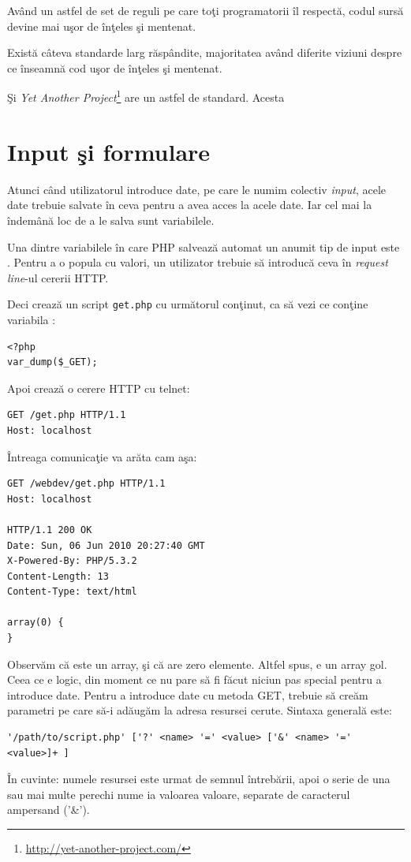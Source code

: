 Având un astfel de set de reguli pe care toţi programatorii îl respectă, codul
sursă devine mai uşor de înţeles şi mentenat.

Există câteva standarde larg răspândite, majoritatea având diferite viziuni
despre ce înseamnă {\glqq}cod uşor de înţeles şi mentenat{\grqq}.

Şi \textit{Yet Another Project}\footnote{\url{http://yet-another-project.com/}}
are un astfel de standard. Acesta


\section{Input şi formulare}
Atunci când utilizatorul introduce date, pe care le numim colectiv \textsl{input},
acele date trebuie salvate în ceva pentru a avea acces la acele date. Iar cel
mai la îndemână loc de a le salva sunt variabilele.

Una dintre variabilele în care PHP salvează automat un anumit tip de input este \get.
Pentru a o popula cu valori, un utilizator trebuie să introducă ceva în \textsl{request line}-ul
cererii HTTP.

Deci crează un script \texttt{get.php} cu următorul conţinut, ca să vezi ce conţine variabila \get:
\begin{lstlisting}
<?php
var_dump($_GET);
\end{lstlisting}
Apoi crează o cerere HTTP cu telnet:
\begin{verbatim}
GET /get.php HTTP/1.1
Host: localhost

\end{verbatim}
Întreaga comunicaţie va arăta cam aşa:
\begin{verbatim}
GET /webdev/get.php HTTP/1.1
Host: localhost

HTTP/1.1 200 OK
Date: Sun, 06 Jun 2010 20:27:40 GMT
X-Powered-By: PHP/5.3.2
Content-Length: 13
Content-Type: text/html

array(0) {
}
\end{verbatim}
Observăm că {\get} este un array, şi că are zero elemente. Altfel spus,
e un array gol. Ceea ce e logic, din moment ce nu pare să fi făcut niciun
pas special pentru a introduce date. Pentru a introduce date cu metoda GET,
trebuie să creăm parametri pe care să-i adăugăm la adresa resursei cerute.
Sintaxa generală este:
\begin{verbatim}
'/path/to/script.php' ['?' <name> '=' <value> ['&' <name> '=' <value>]+ ]
\end{verbatim}
În cuvinte: numele resursei este urmat de semnul întrebării, apoi o serie de
una sau mai multe perechi nume {\glqq}ia valoarea{\grqq} valoare, separate de caracterul
ampersand ('\&').


